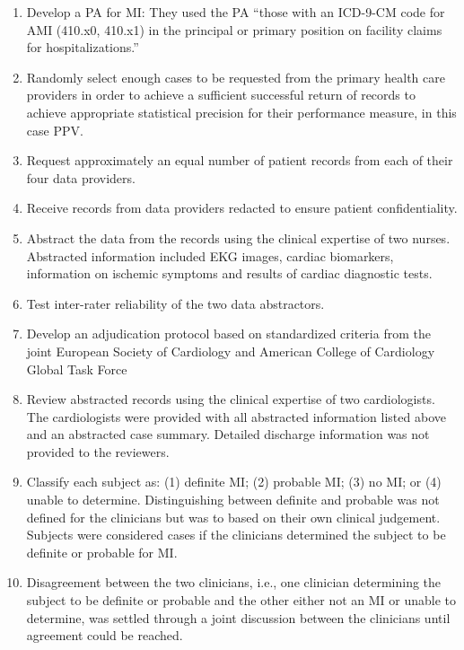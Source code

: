 \documentclass[11pt]{book}
\theoremstyle{definition}
\theoremstyle{definition}
\theoremstyle{definition}
\theoremstyle{remark}
\begin{document}
\begin{enumerate}
\def\labelenumi{\arabic{enumi})}
\item
  Develop a PA for MI: They used the PA ``those with an ICD-9-CM code for AMI (410.x0, 410.x1) in the principal or primary position on facility claims for hospitalizations.''
\item
  Randomly select enough cases to be requested from the primary health care providers in order to achieve a sufficient successful return of records to achieve appropriate statistical precision for their performance measure, in this case PPV.
\item
  Request approximately an equal number of patient records from each of their four data providers.
\item
  Receive records from data providers redacted to ensure patient confidentiality.
\item
  Abstract the data from the records using the clinical expertise of two nurses. Abstracted information included EKG images, cardiac biomarkers, information on ischemic symptoms and results of cardiac diagnostic tests.
\item
  Test inter-rater reliability of the two data abstractors.
\item
  Develop an adjudication protocol based on standardized criteria from the joint European Society of Cardiology and American College of Cardiology Global Task Force
\item
  Review abstracted records using the clinical expertise of two cardiologists. The cardiologists were provided with all abstracted information listed above and an abstracted case summary. Detailed discharge information was not provided to the reviewers.
\item
  Classify each subject as: (1) definite MI; (2) probable MI; (3) no MI; or (4) unable to determine. Distinguishing between definite and probable was not defined for the clinicians but was to based on their own clinical judgement. Subjects were considered cases if the clinicians determined the subject to be definite or probable for MI.
\item
  Disagreement between the two clinicians, i.e., one clinician determining the subject to be definite or probable and the other either not an MI or unable to determine, was settled through a joint discussion between the clinicians until agreement could be reached.
\end{enumerate}
\end{document}

